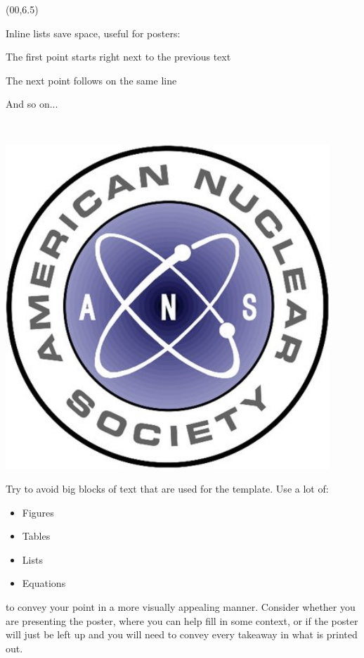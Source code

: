 \documentclass{article}
\def\CHead#1{\begin{center}\noindent{\LARGE\color{DarkBlue} #1}\end{center}}
\renewcommand{\LARGE}{\fontsize{43}{54}\selectfont}
\begin{document}
\begin{textblock}{10}(00,6.5)
\CHead{A Section}
Inline lists save space, useful for posters:
\begin{itemize*}
    \item The first point starts right next to the previous text
    \item The next point follows on the same line
    \item And so on...
\end{itemize*}\\
\lipsum[1]

\begin{center}
\includegraphics[width=4.8in]{ans}
\end{center}

Try to avoid big blocks of text that are used for the template. Use a lot of: 
\begin{itemize}
    \item Figures
    \item Tables
    \item Lists
    \item Equations
\end{itemize}
to convey your point in a more visually appealing manner. Consider whether you are presenting the poster, where you can help fill in some context, or if the poster will just be left up and you will need to convey every takeaway in what is printed out. 

\end{textblock}
\end{document}
